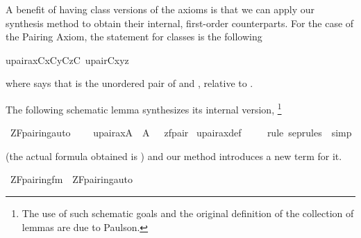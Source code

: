 A benefit of having class versions of the axioms is that we can
apply our synthesis method to obtain their internal, first-order
counterparts.%
For the case of the Pairing Axiom, the statement for classes is the
following
\begin{isabelle}
upair{\isacharunderscore}ax{\isacharparenleft}C{\isacharparenright}{\isacharequal}{\isacharequal}{\isasymforall}x{\isacharbrackleft}C{\isacharbrackright}{\isachardot}{\isasymforall}y{\isacharbrackleft}C{\isacharbrackright}{\isachardot}{\isasymexists}z{\isacharbrackleft}C{\isacharbrackright}{\isachardot}\ upair{\isacharparenleft}C{\isacharcomma}x{\isacharcomma}y{\isacharcomma}z{\isacharparenright}
\end{isabelle}
where  says that  is the unordered pair of
 and , relative to .

The following schematic lemma synthesizes its internal version,%
\footnote{The use of such schematic goals and the original definition
  of the collection of lemmas  are due to Paulson.}
\begin{isabelle}
\isamarkupfalse%
\ ZF{\isacharunderscore}pairing{\isacharunderscore}auto{\isacharcolon}\isanewline
\ \ \ \ {\isachardoublequoteopen}upair{\isacharunderscore}ax{\isacharparenleft}{\isacharhash}{\isacharhash}A{\isacharparenright}\ {\isasymlongleftrightarrow}\ {\isacharparenleft}A{\isacharcomma}\ {\isacharbrackleft}{\isacharbrackright}\ {\isasymTurnstile}\ {\isacharquery}zfpair{\isacharparenright}{\isachardoublequoteclose}\isanewline
{}\isamarkupfalse%
\ upair{\isacharunderscore}ax{\isacharunderscore}def\ \isanewline
\ \ \isamarkupfalse%
\ {\isacharparenleft}{\isacharparenleft}rule\ sep{\isacharunderscore}rules\ {\isacharbar}\ simp{\isacharparenright}{\isacharplus}{\isacharparenright}
\end{isabelle}
(the actual formula obtained is
) and
our  method introduces a new term
 for it.
\begin{isabelle}
\isamarkupfalse%
\ {\isachardoublequoteopen}ZF{\isacharunderscore}pairing{\isacharunderscore}fm{\isachardoublequoteclose}\ \ {\isachardoublequoteopen}ZF{\isacharunderscore}pairing{\isacharunderscore}auto{\isachardoublequoteclose}%
\end{isabelle}


